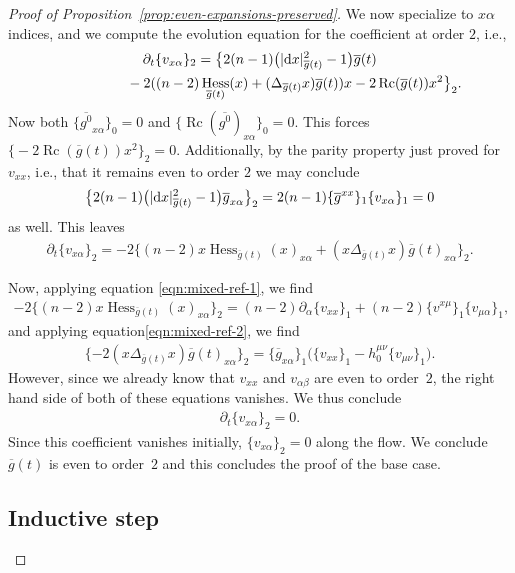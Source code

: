 \documentclass[pdftex]{sigma}
\numberwithin{equation}{section}
\newcommand{\del}{\partial}
\newcommand{\olg}{\overline{g}}
\newcommand{\olgin}{\overline{\gin}}
\newcommand{\gin}{{g^0}}
\newcommand{\gbar}{\overline{g}}
\DeclareMathOperator{\Rc}{Rc}
\DeclareMathOperator{\hess}{Hess}
\begin{document}
\begin{proof}[Proof of Proposition~\ref{prop:even-expansions-preserved}]
We now specialize to $x\alpha$ indices, and we compute the evolution equation for the coefficient at order $2$, i.e.,
\begin{gather*}
\del_t \{ v_{x\alpha} \}_{2}
 =\big\{ 2 (n-1) \big(|{\rm d}x|^2_{\gbar(t)} -1\big) \olg(t) \\
 \hphantom{\del_t \{ v_{x\alpha} \}_{2}=}{} -2 ( (n-2) \hess_{\olg(t)} (x) + (\Delta_{\olg(t)} x) \olg(t) ) x -2 \Rc(\gbar(t)) x^2 \big\}_2.
\end{gather*}
Now both $\big\{ \olgin_{x\alpha} \big\}_0 = 0$ and $\big\{\Rc(\olgin)_{x\alpha} \big\}_0 = 0$. This forces $\big\{ {-}2 \Rc(\gbar(t)) x^2 \big\}_2 = 0$. Additionally, by the parity property just proved for~$v_{xx}$, i.e., that it remains even to order $2$ we may conclude
\begin{gather*}
\big\{2 (n-1) \big(|{\rm d}x|^2_{\gbar(t)} -1\big) \olg_{x\alpha} \big\}_{2} = 2(n-1)\{\olg^{xx}\}_1 \{ v_{x\alpha}\}_1 = 0
\end{gather*}
as well. This leaves
\begin{gather*}
\del_t \{ v_{x\alpha} \}_{2} = -2 \{ (n-2) x\hess_{\olg(t)} (x)_{x\alpha} + (x \Delta_{\olg(t)} x) \olg(t)_{x\alpha} \}_2.
\end{gather*}

Now, applying equation \eqref{eqn:mixed-ref-1}, we find
\begin{gather*}
-2 \{ (n-2) x\hess_{\olg(t)} (x)_{x\alpha} \}_{2} = (n-2)\partial_{\alpha} \{v_{xx}\}_1 + (n-2)\{ v^{x \mu} \}_1 \{ v_{\mu \alpha}\}_1,
\end{gather*}
and applying equation\eqref{eqn:mixed-ref-2}, we find
\begin{gather*}
\{ -2 (x\Delta_{\olg(t)} x) \olg(t)_{x\alpha} \}_2 = \{\gbar_{x \alpha}\}_1 \big( \{v_{xx}\}_1 - h_0^{\mu \nu} \{v_{\mu\nu}\}_1\big).
\end{gather*}
However, since we already know that $v_{xx}$ and $v_{\alpha \beta}$ are even to order~$2$, the right hand side of both of these equations vanishes. We thus conclude
\begin{gather*}
\del_t \{ v_{x\alpha} \}_{2} = 0.
\end{gather*}
Since this coefficient vanishes initially, $\{v_{x\alpha}\}_2 = 0$ along the flow. We conclude $\olg(t)$ is even to order~$2$ and this concludes the proof of the base case.

\subsection*{Inductive step}


\end{proof}
\end{document}
